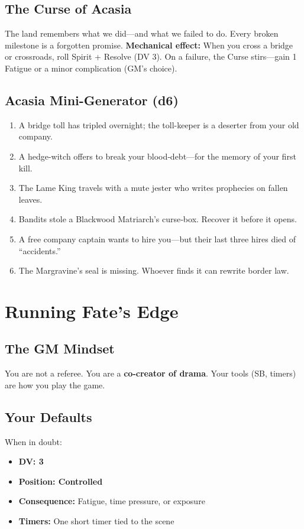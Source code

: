 \documentclass[10pt,twocolumn]{article} %
\begin{document}
\subsection{The Curse of Acasia}
The land remembers what we did—and what we failed to do. Every broken milestone is a forgotten promise.
\textbf{Mechanical effect:} When you cross a bridge or crossroads, roll Spirit + Resolve (DV 3). On a failure, the Curse stirs—gain 1 Fatigue or a minor complication (GM's choice).

\subsection{Acasia Mini-Generator (d6)}
\begin{enumerate}[leftmargin=*]
    \item A bridge toll has tripled overnight; the toll-keeper is a deserter from your old company.
    \item A hedge-witch offers to break your blood‑debt—for the memory of your first kill.
    \item The Lame King travels with a mute jester who writes prophecies on fallen leaves.
    \item Bandits stole a Blackwood Matriarch's curse‑box. Recover it before it opens.
    \item A free company captain wants to hire you—but their last three hires died of ``accidents.''
    \item The Margravine's seal is missing. Whoever finds it can rewrite border law.
\end{enumerate}

\section{Running Fate's Edge}

\subsection{The GM Mindset}
You are not a referee. You are a \textbf{co-creator of drama}. Your tools (SB, timers) are how you play the game.

\subsection{Your Defaults}
When in doubt:
\begin{itemize}[leftmargin=*]
    \item \textbf{DV: 3}
    \item \textbf{Position: Controlled}
    \item \textbf{Consequence:} Fatigue, time pressure, or exposure
    \item \textbf{Timers:} One short timer tied to the scene
\end{itemize}
\end{document}
